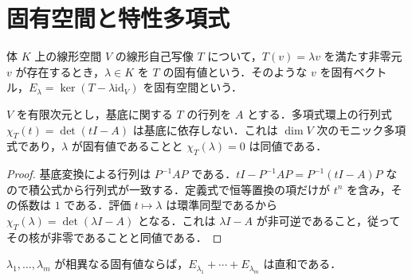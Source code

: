 \section{固有空間と特性多項式}
\begin{defn}[固有値と固有空間]
体 $K$ 上の線形空間 $V$ の線形自己写像 $T$ について，$T(v)=\lambda v$ を満たす非零元 $v$ が存在するとき，$\lambda\in K$ を $T$ の固有値という．そのような $v$ を固有ベクトル，$E_\lambda=\ker(T-\lambda\mathrm{id}_V)$ を固有空間という．
\end{defn}
\begin{prop}[特性多項式]
$V$ を有限次元とし，基底に関する $T$ の行列を $A$ とする．多項式環上の行列式 $\chi_T(t)=\det(tI-A)$ は基底に依存しない．これは $\dim V$ 次のモニック多項式であり，$\lambda$ が固有値であることと $\chi_T(\lambda)=0$ は同値である．
\end{prop}
\begin{proof}
基底変換による行列は $P^{-1}AP$ である．$tI-P^{-1}AP=P^{-1}(tI-A)P$ なので積公式から行列式が一致する．定義式で恒等置換の項だけが $t^n$ を含み，その係数は $1$ である．評価 $t\mapsto\lambda$ は環準同型であるから $\chi_T(\lambda)=\det(\lambda I-A)$ となる．これは $\lambda I-A$ が非可逆であること，従ってその核が非零であることと同値である．
\end{proof}
\begin{prop}[異なる固有値の固有空間の独立性]
$\lambda_1,\ldots,\lambda_m$ が相異なる固有値ならば，$E_{\lambda_1}+\cdots+E_{\lambda_m}$ は直和である．
\end{prop}
